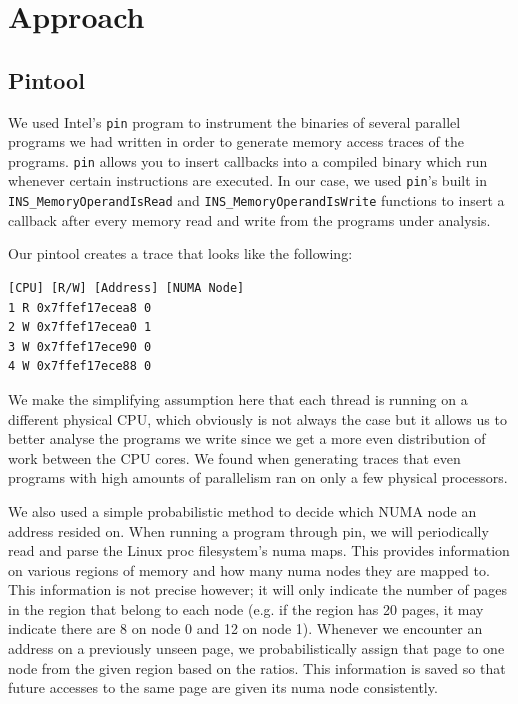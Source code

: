 \documentclass{article}
\begin{document}
\section{Approach}

\subsection{Pintool}
We used Intel's \texttt{pin} program to instrument the binaries of several parallel programs we had written in order to generate memory access traces of the programs.  \texttt{pin} allows you to insert callbacks into a compiled binary which run whenever certain instructions are executed.  In our case, we used \texttt{pin}'s built in \texttt{INS\_MemoryOperandIsRead} and \texttt{INS\_MemoryOperandIsWrite} functions to insert a callback after every memory read and write from the programs under analysis.

Our pintool creates a trace that looks like the following:
\begin{lstlisting}[numbers=none]
[CPU] [R/W] [Address] [NUMA Node]
1 R 0x7ffef17ecea8 0
2 W 0x7ffef17ecea0 1
3 W 0x7ffef17ece90 0
4 W 0x7ffef17ece88 0
\end{lstlisting}

We make the simplifying assumption here that each thread is running on a different physical CPU, which obviously is not always the case but it allows us to better analyse the programs we write since we get a more even distribution of work between the CPU cores.  We found when generating traces that even programs with high amounts of parallelism ran on only a few physical processors.

We also used a simple probabilistic method to decide which NUMA node an address resided on.  When running a program through pin, we will periodically read and parse the Linux proc filesystem's numa maps.  This provides information on various regions of memory and how many numa nodes they are mapped to.  This information is not precise however; it will only indicate the number of pages in the region that belong to each node (e.g. if the region has 20 pages, it may indicate there are 8 on node 0 and 12 on node 1).  Whenever we encounter an address on a previously unseen page, we probabilistically assign that page to one node from the given region based on the ratios.  This information is saved so that future accesses to the same page are given its numa node consistently.
\end{document}
